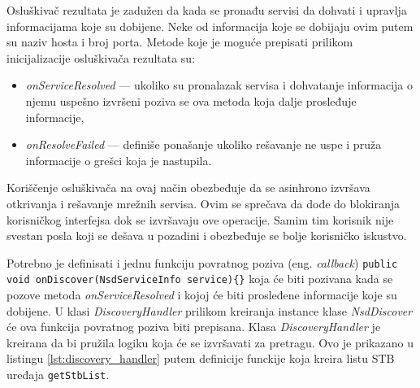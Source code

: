 \documentclass[struktura.tex]{subfiles}
\begin{document}
Osluškivač rezultata je zadužen da kada se pronađu servisi da dohvati i upravlja informacijama koje su dobijene. Neke od informacija koje se dobijaju ovim putem su naziv hosta i broj porta. Metode koje je moguće prepisati prilikom inicijalizacije osluškivača rezultata su:
\begin{itemize}
    \item \textit{onServiceResolved} --- ukoliko su pronalazak servisa i dohvatanje informacija o njemu uspešno izvršeni poziva se ova metoda koja dalje prosleđuje informacije,
    \item \textit{onResolveFailed} --- definiše ponašanje ukoliko rešavanje ne uspe i pruža informacije o grešci koja je nastupila.
\end{itemize}

Koriščenje osluškivača na ovaj način obezbeđuje da se asinhrono izvršava otkrivanja i rešavanje mrežnih servisa. Ovim se sprečava da dođe do blokiranja korisničkog interfejsa dok se izvršavaju ove operacije. Samim tim korisnik nije svestan posla koji se dešava u pozadini i obezbeđuje se bolje korisničko iskustvo. 

Potrebno je definisati i jednu funkciju povratnog poziva (eng. \textit{callback}) \verb|public void onDiscover(NsdServiceInfo service){}| koja će biti pozivana kada se pozove metoda \textit{onServiceResolved} i kojoj će biti prosleđene informacije koje su dobijene.  U klasi \textit{DiscoveryHandler} prilikom kreiranja instance klase \textit{NsdDiscover} će ova funkcija povratnog poziva biti prepisana. Klasa \textit{DiscoveryHandler} je kreirana da bi pružila logiku koja će se izvršavati za pretragu. Ovo je prikazano u listingu \ref{lst:discovery_handler} putem definicije funckije koja kreira listu STB uređaja \verb|getStbList|.


\end{document}
